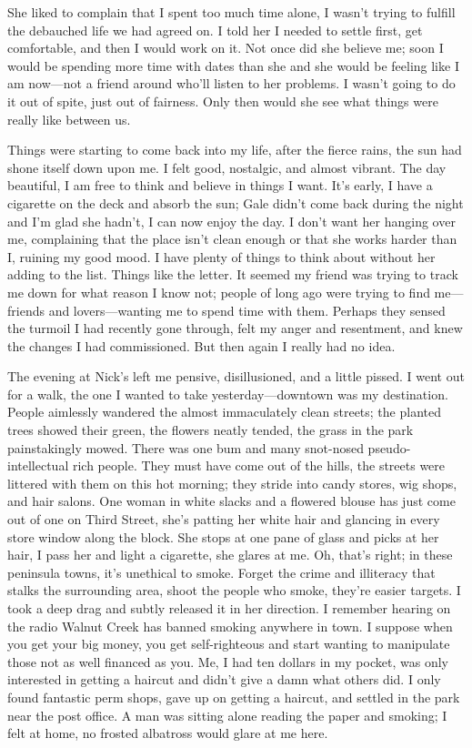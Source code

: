She liked to complain that I spent too much time alone, I wasn't trying
to fulfill the debauched life we had agreed on. I told her I needed to
settle first, get comfortable, and then I would work on it. Not once did
she believe me; soon I would be spending more time with dates than she
and she would be feeling like I am now---not a friend around who'll
listen to her problems. I wasn't going to do it out of spite, just out
of fairness. Only then would she see what things were really like
between us.

Things were starting to come back into my life, after the fierce rains,
the sun had shone itself down upon me. I felt good, nostalgic, and
almost vibrant. The day beautiful, I am free to think and believe in
things I want. It's early, I have a cigarette on the deck and absorb the
sun; Gale didn't come back during the night and I'm glad she hadn't, I
can now enjoy the day. I don't want her hanging over me, complaining
that the place isn't clean enough or that she works harder than I,
ruining my good mood. I have plenty of things to think about without her
adding to the list. Things like the letter. It seemed my friend was
trying to track me down for what reason I know not; people of long ago
were trying to find me---friends and lovers---wanting me to spend time
with them. Perhaps they sensed the turmoil I had recently gone through,
felt my anger and resentment, and knew the changes I had commissioned.
But then again I really had no idea.

The evening at Nick's left me pensive, disillusioned, and a little
pissed. I went out for a walk, the one I wanted to take
yesterday---downtown was my destination. People aimlessly wandered the
almost immaculately clean streets; the planted trees showed their green,
the flowers neatly tended, the grass in the park painstakingly mowed.
There was one bum and many snot-nosed pseudo-intellectual rich people.
They must have come out of the hills, the streets were littered with
them on this hot morning; they stride into candy stores, wig shops, and
hair salons. One woman in white slacks and a flowered blouse has just
come out of one on Third Street, she's patting her white hair and
glancing in every store window along the block. She stops at one pane of
glass and picks at her hair, I pass her and light a cigarette, she
glares at me. Oh, that's right; in these peninsula towns, it's unethical
to smoke. Forget the crime and illiteracy that stalks the surrounding
area, shoot the people who smoke, they're easier targets. I took a deep
drag and subtly released it in her direction. I remember hearing on the
radio Walnut Creek has banned smoking anywhere in town. I suppose when
you get your big money, you get self-righteous and start wanting to
manipulate those not as well financed as you. Me, I had ten dollars in
my pocket, was only interested in getting a haircut and didn't give a
damn what others did. I only found fantastic perm shops, gave up on
getting a haircut, and settled in the park near the post office. A man
was sitting alone reading the paper and smoking; I felt at home, no
frosted albatross would glare at me here.

